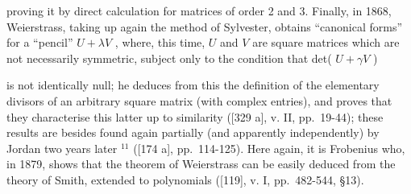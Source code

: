 proving it by direct calculation for matrices of order 2 and 3. Finally, in 1868, Weierstrass, taking up again the method of Sylvester, obtains ``canonical forms'' for a ``pencil'' \(U + \lambda V\) , where, this time, \(U\) and \(V\) are square matrices which are not necessarily symmetric, subject only to the condition that det( \(U + \gamma V\) )

is not identically null; he deduces from this the definition of the elementary divisors of an arbitrary square matrix (with complex entries), and proves that they characterise this latter up to similarity ({[}329 a{]}, v. II, pp.~19-44); these results are besides found again partially (and apparently independently) by Jordan two years later \(^{11}\) ({[}174 a{]}, pp.~114-125). Here again, it is Frobenius who, in 1879, shows that the theorem of Weierstrass can be easily deduced from the theory of Smith, extended to polynomials ({[}119{]}, v. I, pp.~482-544, §13).

